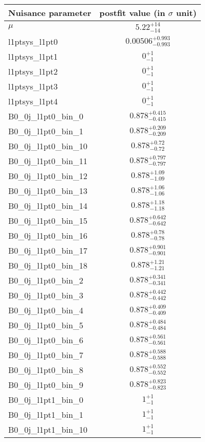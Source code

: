 
\begin{tabular}{|l|c|}
\hline
Nuisance parameter & postfit value (in $\sigma$ unit) \\\hline
$\mu$ & $5.22^{+14}_{-14}$ \\
l1ptsys\_l1pt0 & $0.00506^{+0.993}_{-0.993}$ \\
l1ptsys\_l1pt1 & $0^{+1}_{-1}$ \\
l1ptsys\_l1pt2 & $0^{+1}_{-1}$ \\
l1ptsys\_l1pt3 & $0^{+1}_{-1}$ \\
l1ptsys\_l1pt4 & $0^{+1}_{-1}$ \\
B0\_0j\_l1pt0\_bin\_0 & $0.878^{+0.415}_{-0.415}$ \\
B0\_0j\_l1pt0\_bin\_1 & $0.878^{+0.209}_{-0.209}$ \\
B0\_0j\_l1pt0\_bin\_10 & $0.878^{+0.72}_{-0.72}$ \\
B0\_0j\_l1pt0\_bin\_11 & $0.878^{+0.797}_{-0.797}$ \\
B0\_0j\_l1pt0\_bin\_12 & $0.878^{+1.09}_{-1.09}$ \\
B0\_0j\_l1pt0\_bin\_13 & $0.878^{+1.06}_{-1.06}$ \\
B0\_0j\_l1pt0\_bin\_14 & $0.878^{+1.18}_{-1.18}$ \\
B0\_0j\_l1pt0\_bin\_15 & $0.878^{+0.642}_{-0.642}$ \\
B0\_0j\_l1pt0\_bin\_16 & $0.878^{+0.78}_{-0.78}$ \\
B0\_0j\_l1pt0\_bin\_17 & $0.878^{+0.901}_{-0.901}$ \\
B0\_0j\_l1pt0\_bin\_18 & $0.878^{+1.21}_{-1.21}$ \\
B0\_0j\_l1pt0\_bin\_2 & $0.878^{+0.341}_{-0.341}$ \\
B0\_0j\_l1pt0\_bin\_3 & $0.878^{+0.442}_{-0.442}$ \\
B0\_0j\_l1pt0\_bin\_4 & $0.878^{+0.409}_{-0.409}$ \\
B0\_0j\_l1pt0\_bin\_5 & $0.878^{+0.484}_{-0.484}$ \\
B0\_0j\_l1pt0\_bin\_6 & $0.878^{+0.561}_{-0.561}$ \\
B0\_0j\_l1pt0\_bin\_7 & $0.878^{+0.588}_{-0.588}$ \\
B0\_0j\_l1pt0\_bin\_8 & $0.878^{+0.552}_{-0.552}$ \\
B0\_0j\_l1pt0\_bin\_9 & $0.878^{+0.823}_{-0.823}$ \\
B0\_0j\_l1pt1\_bin\_0 & $1^{+1}_{-1}$ \\
B0\_0j\_l1pt1\_bin\_1 & $1^{+1}_{-1}$ \\
B0\_0j\_l1pt1\_bin\_10 & $1^{+1}_{-1}$ \\

\end{tabular}
